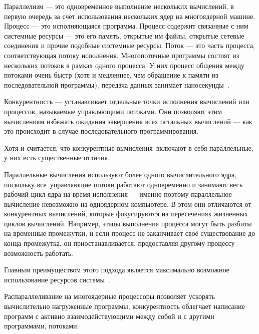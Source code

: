 
\label{sec:relatedworks}
 Параллелизм --- это одновременное выполнение нескольких вычислений, в первую очередь за счет использования нескольких ядер на многоядерной машине.  
Процесс --- это исполняющаяся программа. Процесс содержит связанные с ним системные ресурсы --- это его память, открытые им файлы, открытые сетевые соединения и прочие подобные системные ресурсы.
Поток --- это часть процесса, соответствующая потоку исполнения.
Многопоточные программы состоят из нескольких потоков в рамках одного процесса. 
У них процесс общения между потоками очень быстр 
(хотя и медленнее, чем обращение к памяти из последовательной программы), 
передача данных занимает наносекунды~\cite{parallel}. 

Конкурентность ---  устанавливает 
отдельные точки исполнения вычислений или процессов, 
называемые управляющими потоками. Они позволяют этим вычислениям избежать ожидания завершения всех 
остальных вычислений --- как это происходит в случае последовательного программирования.

Хотя и считается, что конкурентные вычисления включают в себя параллельные, у них есть существенные отличия.

Параллельные вычисления используют более одного вычислительного ядра, поскольку все управляющие потоки работают одновременно и 
занимают весь рабочий цикл ядра на время исполнения — именно поэтому параллельное вычисление невозможно на одноядерном компьютере. 
В этом они отличаются от конкурентных вычислений, которые фокусируются на пересечениях жизненных циклов вычислений. 
Например, этапы выполнения процесса могут быть разбиты на временные промежутки, и если процесс не заканчивает своё существование 
до конца промежутка, он приостанавливается, предоставляя другому процессу возможность работать.

Главным преимуществом этого подхода является максимально возможное использование ресурсов системы~\cite{concurrency}.

Распараллеливание на многоядерные процессоры позволяет ускорять вычислительно нагруженные программы, 
конкурентность облегчает написание программ с активно взаимодействующими между собой и с другими программами, потоками.

